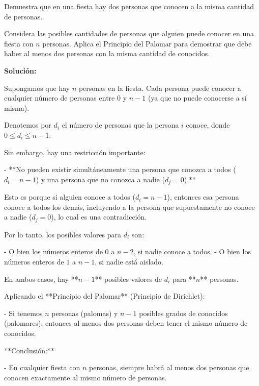 \documentclass[11pt]{scrartcl}
\begin{document}
\begin{problem}
Demuestra que en una fiesta hay dos personas que conocen a la misma cantidad de personas.

\begin{hint}
Considera las posibles cantidades de personas que alguien puede conocer en una fiesta con $n$ personas. Aplica el Principio del Palomar para demostrar que debe haber al menos dos personas con la misma cantidad de conocidos.

\begin{solu}
\textbf{Solución:}

Supongamos que hay $n$ personas en la fiesta. Cada persona puede conocer a cualquier número de personas entre $0$ y $n - 1$ (ya que no puede conocerse a sí misma).

Denotemos por $d_i$ el número de personas que la persona $i$ conoce, donde $0 \leq d_i \leq n - 1$.

Sin embargo, hay una restricción importante:

- **No pueden existir simultáneamente una persona que conozca a todos ($d_i = n - 1$) y una persona que no conozca a nadie ($d_j = 0$).**

Esto es porque si alguien conoce a todos ($d_i = n - 1$), entonces esa persona conoce a todos los demás, incluyendo a la persona que supuestamente no conoce a nadie ($d_j = 0$), lo cual es una contradicción.

Por lo tanto, los posibles valores para $d_i$ son:

- O bien los números enteros de $0$ a $n - 2$, si nadie conoce a todos.
- O bien los números enteros de $1$ a $n - 1$, si nadie está aislado.

En ambos casos, hay **$n - 1$** posibles valores de $d_i$ para **$n$** personas.

Aplicando el **Principio del Palomar** (Principio de Dirichlet):

- Si tenemos $n$ personas (palomas) y $n - 1$ posibles grados de conocidos (palomares), entonces al menos dos personas deben tener el mismo número de conocidos.

**Conclusión:**

- En cualquier fiesta con $n$ personas, siempre habrá al menos dos personas que conocen exactamente al mismo número de personas.
\end{solu}
\end{hint}
\end{problem}
\end{document}
